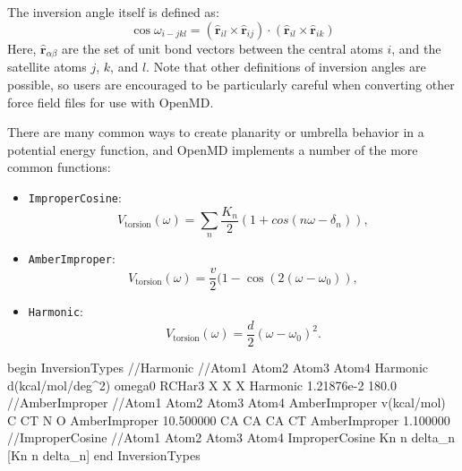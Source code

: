\documentclass[letterpaper]{report}
\begin{document}
The inversion angle itself is defined as:
\begin{equation}
\cos\omega_{i-jkl} = \left(\hat{\mathbf{r}}_{il} \times
  \hat{\mathbf{r}}_{ij}\right)\cdot\left( \hat{\mathbf{r}}_{il} \times
  \hat{\mathbf{r}}_{ik}\right)
\end{equation}
Here, $\hat{\mathbf{r}}_{\alpha\beta}$ are the set of unit bond
vectors between the central atoms $i$, and the satellite atoms $j$,
$k$, and $l$.  Note that other definitions of inversion angles are
possible, so users are encouraged to be particularly careful when
converting other force field files for use with OpenMD.

There are many common ways to create planarity or umbrella behavior in
a potential energy function, and OpenMD implements a number of the
more common functions:
\begin{itemize}
\item {\tt ImproperCosine}:
\begin{equation*}
V_{\text{torsion}}(\omega) = \sum_n \frac{K_n}{2} \left( 1 + cos(n
  \omega - \delta_n) \right),
\end{equation*}
\item {\tt AmberImproper}:
\begin{equation*}
  V_{\text{torsion}}(\omega) =  \frac{v}{2} (1 - \cos\left(2 \left(\omega - \omega_0\right)\right),
\end{equation*}
\item {\tt Harmonic}:
\begin{equation*}
V_{\text{torsion}}(\omega) =  \frac{d}{2} \left(\omega - \omega_0\right)^2.
\end{equation*}
\end{itemize}
\begin{code}[caption={[An example of an InversionTypes block.] A
simple example of a InversionTypes block.  Angles ($\delta_n$ and
$\omega_0$) angles are given in degrees, while energy parameters ($v,
K_n$) are given in kcal / mol.   The Harmonic Inversion type has a
force constant that must be given in kcal/mol/degrees$^2$.},
label={sch:InversionTypes}]
begin InversionTypes
//Harmonic
//Atom1 Atom2   Atom3   Atom4   Harmonic  d(kcal/mol/deg^2)  omega0
RCHar3  X       X       X       Harmonic  1.21876e-2         180.0
//AmberImproper
//Atom1 Atom2   Atom3   Atom4   AmberImproper   v(kcal/mol)
C       CT      N       O       AmberImproper   10.500000
CA      CA      CA      CT      AmberImproper   1.100000 
//ImproperCosine
//Atom1 Atom2   Atom3   Atom4   ImproperCosine  Kn  n  delta_n  [Kn n delta_n]
end InversionTypes
\end{code}
\end{document}
